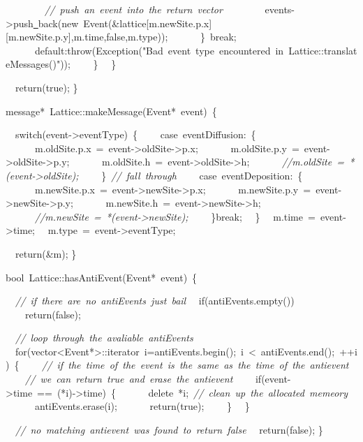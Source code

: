 {\ \ \ \ \ \ \ \ \textsl{//\ push\ an\ event\ into\ the\ return\ vector}
\ \ \ \ \ \ \ \ events-{}>{}push\underline\ back(new\ Event(\&lattice[m.newSite.p.x][m.newSite.p.y],m.time,false,m.type));
\ \ \ \ \ \ \}\ break;
\ \ \ \ \ \ default:throw(Exception("{}Bad\ event\ type\ encountered\ in\ Lattice::translateMessages()"{}));
\ \ \ \ \}
\ \ \}

\ \ return(true);
\}

message*\ Lattice::makeMessage(Event*\ event)\ \{

\ \ switch(event-{}>{}eventType)\ \{
\ \ \ \ case\ eventDiffusion:\ \{
\ \ \ \ \ \ m.oldSite.p.x\ =\ event-{}>{}oldSite-{}>{}p.x;
\ \ \ \ \ \ m.oldSite.p.y\ =\ event-{}>{}oldSite-{}>{}p.y;
\ \ \ \ \ \ m.oldSite.h\ =\ event-{}>{}oldSite-{}>{}h;
\ \ \ \ \ \ \textsl{//m.oldSite\ =\ *(event-{}>{}oldSite);}
\ \ \ \ \}\ \textsl{//\ fall\ through}
\ \ \ \ case\ eventDeposition:\ \{
\ \ \ \ \ \ m.newSite.p.x\ =\ event-{}>{}newSite-{}>{}p.x;
\ \ \ \ \ \ m.newSite.p.y\ =\ event-{}>{}newSite-{}>{}p.y;
\ \ \ \ \ \ m.newSite.h\ =\ event-{}>{}newSite-{}>{}h;
\ \ \ \ \ \ \textsl{//m.newSite\ =\ *(event-{}>{}newSite);}
\ \ \ \ \}break;
\ \ \}
\ \ m.time\ =\ event-{}>{}time;
\ \ m.type\ =\ event-{}>{}eventType;

\ \ return(\&m);
\}

bool\ Lattice::hasAntiEvent(Event*\ event)\ \{

\ \ \textsl{//\ if\ there\ are\ no\ antiEvents\ just\ bail}
\ \ if(antiEvents.empty())
\ \ \ \ return(false);

\ \ \textsl{//\ loop\ through\ the\ avaliable\ antiEvents}
\ \ for(vector<{}Event*>{}::iterator\ i=antiEvents.begin();\ i\ <{}\ antiEvents.end();\ ++i)\ \{
\ \ \ \ \textsl{//\ if\ the\ time\ of\ the\ event\ is\ the\ same\ as\ the\ time\ of\ the\ antievent}
\ \ \ \ \textsl{//\ we\ can\ return\ true\ and\ erase\ the\ antievent}
\ \ \ \ if(event-{}>{}time\ ==\ (*i)-{}>{}time)\ \{
\ \ \ \ \ \ delete\ *i;\ \textsl{//\ clean\ up\ the\ allocated\ memeory}
\ \ \ \ \ \ antiEvents.erase(i);
\ \ \ \ \ \ return(true);
\ \ \ \ \}
\ \ \}

\ \ \textsl{//\ no\ matching\ antievent\ was\ found\ to\ return\ false}
\ \ return(false);
\}

 }
\normalfont\normalsize

